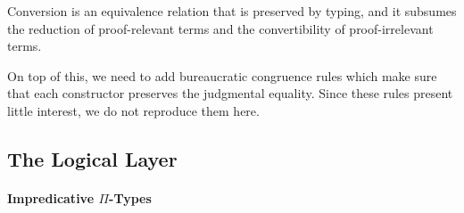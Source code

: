 Conversion is an equivalence relation that is preserved by typing, and it 
subsumes the reduction of proof-relevant terms and the convertibility of
proof-irrelevant terms.
% 
% 
On top of this, we need to add bureaucratic congruence rules which make sure
that each constructor preserves the judgmental equality.
% 
Since these rules present little interest, we do not reproduce them here.

\subsection{The Logical Layer}

\paragraph*{Impredicative \( \Pi \)-Types}

